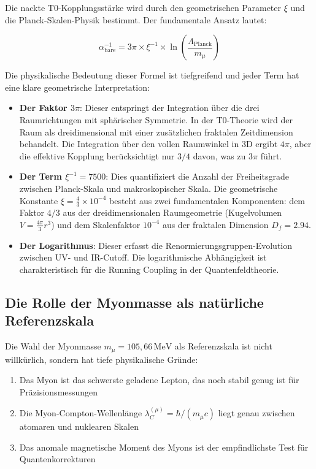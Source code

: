 \documentclass[12pt,a4paper]{article}
\theoremstyle{definition}
\begin{document}
	Die nackte T0-Kopplungsstärke wird durch den geometrischen Parameter $\xi$ und die Planck-Skalen-Physik bestimmt. Der fundamentale Ansatz lautet:
	
	\begin{equation}
		\alpha_{\text{bare}}^{-1} = 3\pi \times \xi^{-1} \times \ln\left(\frac{\Lambda_{\text{Planck}}}{m_{\mu}}\right)
	\end{equation}
	
	Die physikalische Bedeutung dieser Formel ist tiefgreifend und jeder Term hat eine klare geometrische Interpretation:
	
	\begin{itemize}
		\item \textbf{Der Faktor $3\pi$}: Dieser entspringt der Integration über die drei Raumrichtungen mit sphärischer Symmetrie. In der T0-Theorie wird der Raum als dreidimensional mit einer zusätzlichen fraktalen Zeitdimension behandelt. Die Integration über den vollen Raumwinkel in 3D ergibt $4\pi$, aber die effektive Kopplung berücksichtigt nur $3/4$ davon, was zu $3\pi$ führt.
		
		\item \textbf{Der Term $\xi^{-1} = 7500$}: Dies quantifiziert die Anzahl der Freiheitsgrade zwischen Planck-Skala und makroskopischer Skala. Die geometrische Konstante $\xi = \frac{4}{3} \times 10^{-4}$ besteht aus zwei fundamentalen Komponenten: dem Faktor $4/3$ aus der dreidimensionalen Raumgeometrie (Kugelvolumen $V = \frac{4\pi}{3}r^3$) und dem Skalenfaktor $10^{-4}$ aus der fraktalen Dimension $D_f = 2.94$.
		
		\item \textbf{Der Logarithmus}: Dieser erfasst die Renormierungsgruppen-Evolution zwischen UV- und IR-Cutoff. Die logarithmische Abhängigkeit ist charakteristisch für die Running Coupling in der Quantenfeldtheorie.
	\end{itemize}
	
	\subsection{Die Rolle der Myonmasse als natürliche Referenzskala}
	
	Die Wahl der Myonmasse $m_{\mu} = 105{,}66\,\text{MeV}$ als Referenzskala ist nicht willkürlich, sondern hat tiefe physikalische Gründe:
	
	\begin{enumerate}
		\item Das Myon ist das schwerste geladene Lepton, das noch stabil genug ist für Präzisionsmessungen
		\item Die Myon-Compton-Wellenlänge $\lambda_C^{(\mu)} = \hbar/(m_\mu c)$ liegt genau zwischen atomaren und nuklearen Skalen
		\item Das anomale magnetische Moment des Myons ist der empfindlichste Test für Quantenkorrekturen
	\end{enumerate}
	
\end{document}
